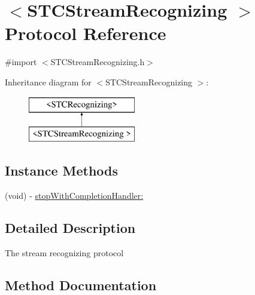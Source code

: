 \hypertarget{protocol_s_t_c_stream_recognizing_01-p}{}\section{$<$S\+T\+C\+Stream\+Recognizing $>$ Protocol Reference}
\label{protocol_s_t_c_stream_recognizing_01-p}


{\ttfamily \#import $<$S\+T\+C\+Stream\+Recognizing.\+h$>$}

Inheritance diagram for $<$S\+T\+C\+Stream\+Recognizing $>$\+:\begin{figure}[H]
\begin{center}
\leavevmode
\includegraphics[height=2.000000cm]{protocol_s_t_c_stream_recognizing_01-p}
\end{center}
\end{figure}
\subsection*{Instance Methods}
\begin{DoxyCompactItemize}
\item 
(void) -\/ \hyperlink{protocol_s_t_c_stream_recognizing_01-p_ab2dd9582d7c35f4e51aad46cd166fe66}{stop\+With\+Completion\+Handler\+:}
\end{DoxyCompactItemize}


\subsection{Detailed Description}
The stream recognizing protocol 

\subsection{Method Documentation}
\hypertarget{protocol_s_t_c_stream_recognizing_01-p_ab2dd9582d7c35f4e51aad46cd166fe66}{}\label{protocol_s_t_c_stream_recognizing_01-p_ab2dd9582d7c35f4e51aad46cd166fe66} 
